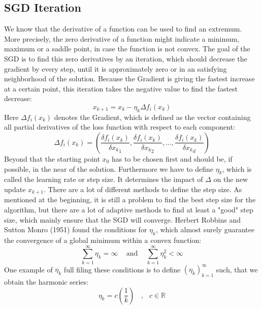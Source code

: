 \documentclass{article}
\begin{document}
\subsection{SGD Iteration}
We know that the derivative of a function can be used to find an extremum. More precisely, the zero derivative of a function might indicate a minimum, maximum or a saddle point, in case the function is not convex. The goal of the SGD is to find this zero derivatives by an iteration, which should decrease the gradient by every step, until it is approximately zero or in an satisfying neighborhood of the solution. Because the Gradient is giving the fastest increase at a certain point, this iteration takes the negative value to find the fastest decrease:
\begin{equation}
x_{k+1} = x_k - \eta_k \Delta f_i(x_k)
\end{equation}
Here \( \Delta f_i(x_k)\) denotes the Gradient, which is defined as the vector containing all partial derivatives of the loss function with respect to each component:
\begin{equation} 
 \Delta f_i(x_k) = ( \frac{\delta f_i(x_k)}{\delta {x_k}_1}, \frac{\delta f_i(x_k)}{\delta {x_k}_2}, ... , \frac{\delta f_i(x_k)}{\delta {x_k}_d}) 
\end{equation}
Beyond that the starting point \(  x_0 \) has to be chosen first and should be, if possible, in the near of the solution. Furthermore we have to define \( \eta_k \), which is called the learning rate or step size. It determines the impact of \( \Delta \) on the new update \( x_{k+1}\). There are a lot of different methods to define the step size. As mentioned at the beginning, it is still a problem to find the best step size for the algorithm, but there are a lot of adaptive methods to find at least a "good" step size, which mainly ensure that the SGD will converge. Herbert Robbins and Sutton Monro (1951)  \cite{Herbert} found the conditions for \( \eta_k \), which almost surely guarantee the convergence of a global minimum within a convex function: 
\begin{equation} 
\sum_{k = 1}^{\infty}\eta_k = \infty \; \; \; \textrm{ and } \; \; \; \sum_{k = 1}^{\infty}\eta_k^2 < \infty
\end{equation}
One example of \( \eta_k \) full filing these conditions is to define \( {(\eta_k)}_{k=1}^\infty \) such, that we obtain the harmonic series:
\begin{equation}\label{eq:9}
\eta_k = c(\frac{1}{k}) \; \;\textrm{ , }\; \; c \in \mathbb{R}
\end{equation}
\end{document}
